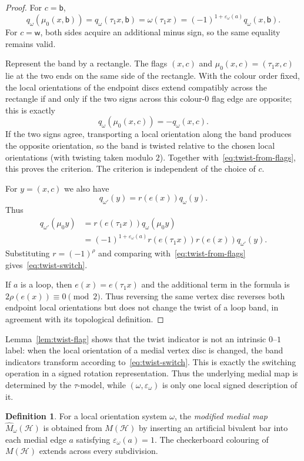 \documentclass[10pt,a4paper]{article}
\theoremstyle{definition}
\newtheorem{definition}[theorem]{Definition}
\theoremstyle{remark}
\newcommand{\Hcal}{\mathcal{H}}
\begin{document}
\begin{proof}
For $c=\mathsf b$,
\[
 q_\omega(\mu_0(x,\mathsf b))
 =q_\omega(\tau_1x,\mathsf b)
 =\omega(\tau_1x)
 =(-1)^{1+\varepsilon_\omega(a)}q_\omega(x,\mathsf b).
\]
For $c=\mathsf w$, both sides acquire an additional minus sign, so the same equality remains valid.

Represent the band by a rectangle. The flags $(x,c)$ and $\mu_0(x,c)=(\tau_1x,c)$ lie at the two ends on the same side of the rectangle. With the colour order fixed, the local orientations of the endpoint discs extend compatibly across the rectangle if and only if the two signs across this colour-$0$ flag edge are opposite; this is exactly
\[
  q_\omega(\mu_0(x,c))=-q_\omega(x,c).
\]
If the two signs agree, transporting a local orientation along the band produces the opposite orientation, so the band is twisted relative to the chosen local orientations (with twisting taken modulo $2$). Together with~\eqref{eq:twist-from-flags}, this proves the criterion. The criterion is independent of the choice of $c$.

For $y=(x,c)$ we also have
\[
 q_{\omega'}(y)=r(e(x))q_\omega(y).
\]
Thus
\[
\begin{aligned}
 q_{\omega'}(\mu_0y)
 &=r(e(\tau_1x))q_\omega(\mu_0y)\\
 &=(-1)^{1+\varepsilon_\omega(a)}
   r(e(\tau_1x))r(e(x))q_{\omega'}(y).
\end{aligned}
\]
Substituting $r=(-1)^\rho$ and comparing with~\eqref{eq:twist-from-flags} gives~\eqref{eq:twist-switch}.

If $a$ is a loop, then $e(x)=e(\tau_1x)$ and the additional term in the formula is $2\rho(e(x))\equiv0\pmod2$. Thus reversing the same vertex disc reverses both endpoint local orientations but does not change the twist of a loop band, in agreement with its topological definition.
\end{proof}

Lemma~\ref{lem:twist-flag} shows that the twist indicator is not an intrinsic $0$--$1$ label: when the local orientation of a medial vertex disc is changed, the band indicators transform according to~\eqref{eq:twist-switch}. This is exactly the switching operation in a signed rotation representation. Thus the underlying medial map is determined by the $\tau$-model, while $(\omega,\varepsilon_\omega)$ is only one local signed description of it.

\begin{definition}\label{def:modified-medial}
For a local orientation system $\omega$, the \emph{modified medial map} $\widehat M_\omega(\Hcal)$ is obtained from $M(\Hcal)$ by inserting an artificial bivalent bar into each medial edge $a$ satisfying $\varepsilon_\omega(a)=1$. The checkerboard colouring of $M(\Hcal)$ extends across every subdivision.
\end{definition}
\end{document}
